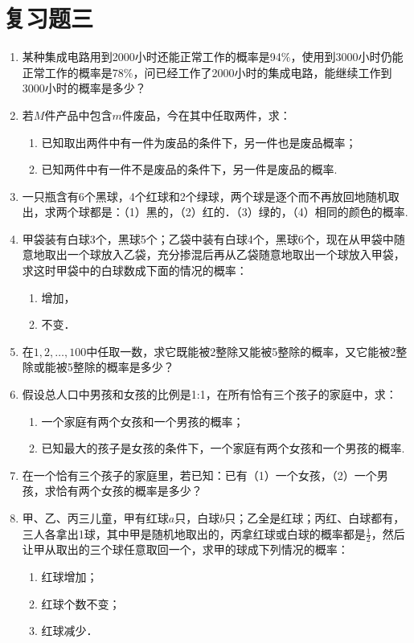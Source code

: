 \section*{复习题三}
\begin{enumerate}
    \item 某种集成电路用到2000小时还能正常工作的概率是94\%，使用到3000小时仍能正常工作的概率是78\%，问已经工作了2000小时的集成电路，能继续工作到3000小时的概率是多少？
    \item 若$M$件产品中包含$m$件废品，今在其中任取两件，求：
\begin{enumerate}[(1)]
\item 已知取出两件中有一件为废品的条件下，另一件也是废品概率；
\item 已知两件中有一件不是废品的条件下，另一件是废品的概率.
\end{enumerate}
    \item 一只瓶含有6个黑球，4个红球和2个绿球，两个球是逐个而不再放回地随机取出，求两个球都是：（1）黑的，（2）红的．（3）绿的，（4）相同的颜色的概率.
    \item 甲袋装有白球3个，黑球5个；乙袋中装有白球4个，黑球6个，现在从甲袋中随意地取出一个球放入乙袋，充分掺混后再从乙袋随意地取出一个球放入甲袋，求这时甲袋中的白球数成下面的情况的概率：
\begin{multicols}{2}
\begin{enumerate}[(1)]
\item 增加，    \item 不变．
\end{enumerate}
\end{multicols}

    \item 在$1,2,\ldots,100$中任取一数，求它既能被2整除又能被5整除的概率，又它能被2整除或能被5整除的概率是多少？
\item 假设总人口中男孩和女孩的比例是1:1，在所有恰有三个孩子的家庭中，求：
\begin{enumerate}[(1)]
\item 一个家庭有两个女孩和一个男孩的概率；
\item 已知最大的孩子是女孩的条件下，一个家庭有两个女孩和一个男孩的概率.
\end{enumerate}

\item 在一个恰有三个孩子的家庭里，若已知：已有（1）一个女孩，（2）一个男孩，求恰有两个女孩的概率是多少？
\item 甲、乙、丙三儿童，甲有红球$a$只，白球$b$只；乙全是红球；丙红、白球都有，三人各拿出1球，其中甲是随机地取出的，丙拿红球或白球的概率都是$\frac{1}{2}$，然后让甲从取出的三个球任意取回一个，求甲的球成下列情况的概率：
\begin{multicols}{3}
\begin{enumerate}[(1)]
\item 红球增加；
\item 红球个数不变；
\item 红球减少．
\end{enumerate}
\end{multicols}


\end{enumerate}
